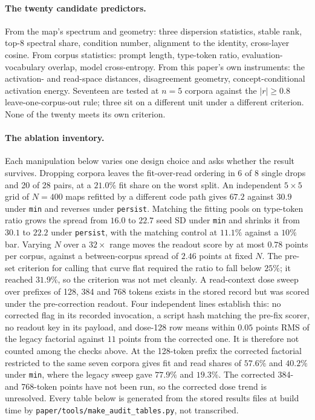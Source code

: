 \documentclass{article}
\newcommand{\mn}{\texttt{min}}
\newcommand{\pe}{\texttt{persist}}
\begin{document}
\paragraph{The twenty candidate predictors.} From the map's spectrum and geometry: three
dispersion statistics, stable rank, top-8 spectral share, condition number, alignment to the
identity, cross-layer cosine. From corpus statistics: prompt length, type-token ratio,
evaluation-vocabulary overlap, model cross-entropy. From this paper's own instruments: the
activation- and read-space distances, disagreement geometry, concept-conditional activation energy.
Seventeen are tested at $n{=}5$ corpora against the $|r|\ge0.8$ leave-one-corpus-out rule; three sit
on a different unit under a different criterion. None of the twenty meets its own criterion.

\paragraph{The ablation inventory.} Each manipulation below varies one design choice and asks
whether the result survives. Dropping corpora leaves the fit-over-read ordering in 6 of 8
single drops and 20 of 28 pairs, at a $21.0\%$ fit share on the worst split. An independent
$5\times5$ grid of $N{=}400$ maps refitted by a different code path gives $67.2$ against $30.9$
under \mn{} and reverses under \pe. Matching the fitting
pools on type-token ratio grows the spread from $16.0$ to $22.7$ seed SD under \mn{} and shrinks it
from $30.1$ to $22.2$ under \pe, with the matching control at $11.1\%$ against a $10\%$ bar.
Varying $N$ over a $32\times$ range moves the readout score by at most $0.78$ points per corpus,
against a between-corpus spread of $2.46$ points at fixed $N$. The pre-set criterion for calling that curve flat
required the ratio to fall below $25\%$; it reached $31.9\%$, so the criterion was not met cleanly.
A read-context dose sweep over prefixes of 128, 384 and 768 tokens exists in the stored record but
was scored under the pre-correction readout. Four independent lines establish this: no corrected
flag in its recorded invocation, a script hash matching the pre-fix scorer, no readout key in its
payload, and dose-128 row means within $0.05$ points RMS of the legacy factorial against $11$ points from
the corrected one. It is therefore not counted among the checks above. At the 128-token prefix the
corrected factorial restricted to the same seven corpora gives fit and read shares of $57.6\%$ and
$40.2\%$ under \mn{}, where the legacy sweep gave $77.9\%$ and $19.3\%$. The corrected 384- and
768-token points have not been run, so the corrected dose trend is unresolved.
Every table below is
generated from the stored results files at build time by \texttt{paper/tools/make\_audit\_tables.py},
not transcribed.
\end{document}
